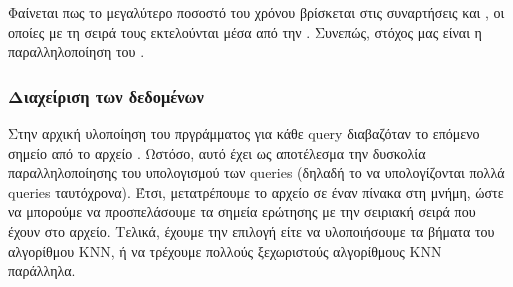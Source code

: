 \documentclass[11pt]{scrartcl} %
\begin{document}
Φαίνεται πως το μεγαλύτερο ποσοστό του χρόνου βρίσκεται στις συναρτήσεις  και , οι οποίες με τη σειρά τους εκτελούνται 
μέσα από την . Συνεπώς, στόχος μας είναι η παραλληλοποίηση του .

\subsubsection{Διαχείριση των δεδομένων}

Στην αρχική υλοποίηση του πργράμματος για κάθε query διαβαζόταν το επόμενο σημείο από το αρχείο . 
Ωστόσο, αυτό έχει ως αποτέλεσμα την δυσκολία παραλληλοποίησης του υπολογισμού των queries (δηλαδή το να υπολογίζονται πολλά queries ταυτόχρονα).
Έτσι, μετατρέπουμε το αρχείο  σε έναν πίνακα στη μνήμη, ώστε να μπορούμε να προσπελάσουμε τα σημεία ερώτησης με την σειριακή σειρά που έχουν στο αρχείο.
Τελικά, έχουμε την επιλογή είτε να υλοποιήσουμε τα βήματα του αλγορίθμου KNN, ή να τρέχουμε πολλούς ξεχωριστούς αλγορίθμους KNN παράλληλα.
\end{document}
